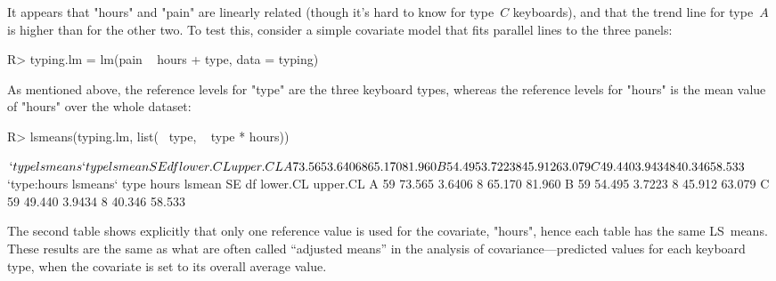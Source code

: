 \documentclass{article}
\begin{document}
It appears that "hours" and "pain" are linearly related (though it's hard to know for type~$C$ keyboards), and that the trend line for type~$A$ is higher than for the other two. To test this,  consider a simple covariate model that fits parallel lines to the three panels:
\begin{Winput}
R> typing.lm = lm(pain ~ hours + type, data = typing)
\end{Winput}
As mentioned above, the reference levels for "type" are the three keyboard types, whereas the reference levels for "hours" is the mean value of "hours" over the whole dataset:
\begin{Winput}
R> lsmeans(typing.lm, list(~ type, ~ type * hours))
\end{Winput}
\begin{multicols}{2}\small
\begin{Woutput}
$`type lsmeans`
 type lsmean     SE df lower.CL upper.CL
    A 73.565 3.6406  8   65.170   81.960
    B 54.495 3.7223  8   45.912   63.079
    C 49.440 3.9434  8   40.346   58.533

$`type:hours lsmeans`
 type hours lsmean     SE df lower.CL upper.CL
    A    59 73.565 3.6406  8   65.170   81.960
    B    59 54.495 3.7223  8   45.912   63.079
    C    59 49.440 3.9434  8   40.346   58.533
\end{Woutput}

\end{multicols}
The second table shows explicitly that only one reference value is used for the covariate, "hours", hence each table has the same LS~means. These results are the same as what are often called ``adjusted means'' in the analysis of covariance---predicted values for each keyboard type, when the covariate is set to its overall average value.
\end{document}
